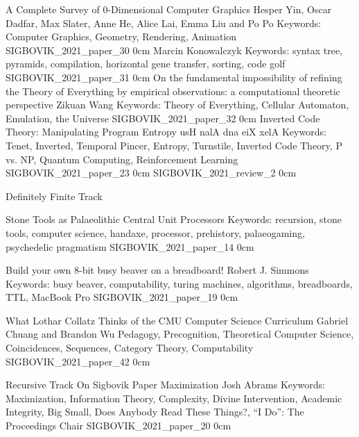 \addpaper
    {A Complete Survey of 0-Dimensional Computer Graphics}
    {Hesper Yin, Oscar Dadfar, Max Slater, Anne He, Alice Lai, Emma Liu and Po Po}
    {Keywords: Computer Graphics, Geometry, Rendering, Animation}
    {SIGBOVIK_2021_paper_30}
    {0cm}
    {}
    {Marcin Konowalczyk}
    {Keywords: syntax tree, pyramids, compilation, horizontal gene transfer, sorting, code golf}
    {SIGBOVIK_2021_paper_31}
    {0cm}
    {}
\addpaper
    {On the fundamental impossibility of refining the Theory of Everything by empirical observations: a computational theoretic perspective}
    {Zikuan Wang}
    {Keywords: Theory of Everything, Cellular Automaton, Emulation, the Universe}
    {SIGBOVIK_2021_paper_32}
    {0cm}
    {}
\addpaper
    {Inverted Code Theory: Manipulating Program Entropy}
    {usH nalA dna eiX xelA}
    {Keywords: Tenet, Inverted, Temporal Pincer, Entropy, Turnstile, Inverted Code Theory, P vs. NP, Quantum Computing, Reinforcement Learning}
    {SIGBOVIK_2021_paper_23}
    {0cm}
    {}
\addreview
    {SIGBOVIK_2021_review_2}
    {0cm}



\addtrack
    {}{Definitely Finite Track}


\addpaper
    {Stone Tools as Palaeolithic Central Unit Processors}
    {}
    {Keywords: recursion, stone tools, computer science, handaxe, processor, prehistory, palaeogaming, psychedelic pragmatism}
    {SIGBOVIK_2021_paper_14}
    {0cm}
    {}

\addpaper
    {Build your own 8-bit busy beaver on a breadboard!}
    {Robert J. Simmons}
    {Keywords: busy beaver, computability, turing machines, algorithms, breadboards, TTL, MacBook Pro}
    {SIGBOVIK_2021_paper_19}
    {0cm}
    {}

\addpaper
    {What Lothar Collatz Thinks of the CMU Computer Science Curriculum}
    {Gabriel Chuang and Brandon Wu}
    {Pedagogy, Precognition, Theoretical Computer Science, Coincidences, Sequences, Category Theory, Computability}
    {SIGBOVIK_2021_paper_42}
    {0cm}
    {}

\addtrack
    {}{Recursive Track}
\addpaper
    {On Sigbovik Paper Maximization}
    {Josh Abrams}
    {Keywords: Maximization, Information Theory, Complexity, Divine Intervention, Academic Integrity, Big Small, Does Anybody Read These Things?, ``I Do'': The Proceedings Chair}
    {SIGBOVIK_2021_paper_20}
    {0cm}
    {}

